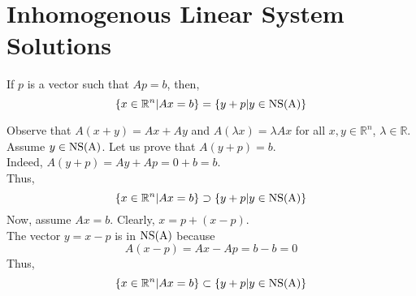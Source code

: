 \documentclass[12pt]{article}
\begin{document}
\section{Inhomogenous Linear System Solutions}
\begin{proposition}{}
If \(p\) is a vector such that \(Ap = b\), then,
\[\{x\in \mathbb R^n | Ax = b\} = \{y + p | y\in \rm{NS}(A)\}\]
\end{proposition}
\begin{prf}{}
Observe that \(A(x+y) = Ax + Ay\) and \(A(\lambda x) = \lambda Ax\) for all \(x, y \in \mathbb R^n\), \(\lambda \in \mathbb R\).\\
Assume \(y \in \rm{NS}(A)\). Let us prove that \(A(y + p) = b\).\\
Indeed, \(A(y+p) = Ay + Ap = 0 + b = b\).\\
Thus,\[\{x\in \mathbb R^n | Ax = b\} \supset \{y + p | y\in \rm{NS}(A)\}\]
Now, assume \(Ax = b\). Clearly, \(x = p + (x - p)\). \\
The vector \(y = x - p\) is in \(\rm{NS}(A)\) because \[A(x - p) = Ax - Ap = b - b = 0\]
Thus, \[\{x\in \mathbb R^n | Ax = b\} \subset \{y + p | y\in \rm{NS}(A)\}\]
\end{prf}
\end{document}
